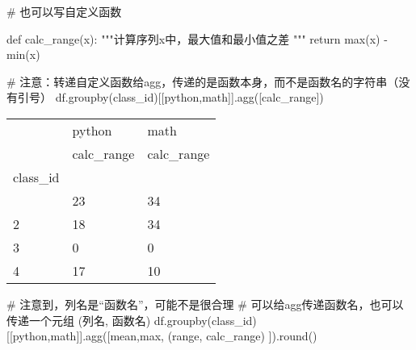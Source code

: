 \documentclass[
  letterpaper,
  DIV=11,
  numbers=noendperiod]{scrreprt}
\newenvironment{Shaded}{\begin{snugshade}}{\end{snugshade}}
\newcommand{\BuiltInTok}[1]{\textcolor[rgb]{0.00,0.23,0.31}{#1}}
\newcommand{\CommentTok}[1]{\textcolor[rgb]{0.37,0.37,0.37}{#1}}
\newcommand{\ControlFlowTok}[1]{\textcolor[rgb]{0.00,0.23,0.31}{#1}}
\newcommand{\KeywordTok}[1]{\textcolor[rgb]{0.00,0.23,0.31}{#1}}
\newcommand{\NormalTok}[1]{\textcolor[rgb]{0.00,0.23,0.31}{#1}}
\newcommand{\OperatorTok}[1]{\textcolor[rgb]{0.37,0.37,0.37}{#1}}
\newcommand{\StringTok}[1]{\textcolor[rgb]{0.13,0.47,0.30}{#1}}
\begin{document}
\begin{Shaded}
\begin{Highlighting}[]
\CommentTok{\# 也可以写自定义函数}

\KeywordTok{def}\NormalTok{ calc\_range(x):}
    \CommentTok{"""计算序列x中，最大值和最小值之差}
\CommentTok{    """}
    \ControlFlowTok{return} \BuiltInTok{max}\NormalTok{(x) }\OperatorTok{{-}} \BuiltInTok{min}\NormalTok{(x)}

\CommentTok{\# 注意：转递自定义函数给agg，传递的是函数本身，而不是函数名的字符串（没有引号）}
\NormalTok{df.groupby(}\StringTok{\textquotesingle{}class\_id\textquotesingle{}}\NormalTok{)[[}\StringTok{\textquotesingle{}python\textquotesingle{}}\NormalTok{,}\StringTok{\textquotesingle{}math\textquotesingle{}}\NormalTok{]].agg([calc\_range])}
\end{Highlighting}
\end{Shaded}

\begin{longtable}[]{@{}lll@{}}
\toprule\noalign{}
& python & math \\
& calc\_range & calc\_range \\
class\_id & & \\
\midrule\noalign{}
\endhead
\bottomrule\noalign{}
\endlastfoot
1 & 23 & 34 \\
2 & 18 & 34 \\
3 & 0 & 0 \\
4 & 17 & 10 \\
\end{longtable}

\begin{Shaded}
\begin{Highlighting}[]
\CommentTok{\# 注意到，列名是“函数名”，可能不是很合理}
\CommentTok{\# 可以给agg传递函数名，也可以传递一个元组 \textasciigrave{}(列名, 函数名)\textasciigrave{}}
\NormalTok{df.groupby(}\StringTok{\textquotesingle{}class\_id\textquotesingle{}}\NormalTok{)[[}\StringTok{\textquotesingle{}python\textquotesingle{}}\NormalTok{,}\StringTok{\textquotesingle{}math\textquotesingle{}}\NormalTok{]].agg([}\StringTok{\textquotesingle{}mean\textquotesingle{}}\NormalTok{,}\StringTok{\textquotesingle{}max\textquotesingle{}}\NormalTok{,  (}\StringTok{\textquotesingle{}range\textquotesingle{}}\NormalTok{, calc\_range)  ]).}\BuiltInTok{round}\NormalTok{()}
\end{Highlighting}
\end{Shaded}
\end{document}
